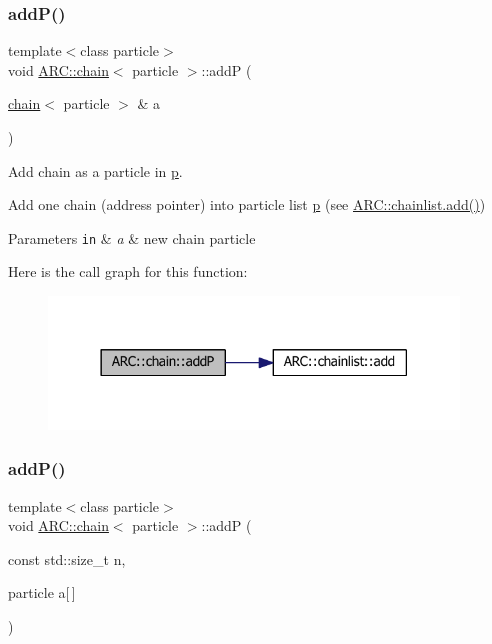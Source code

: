 \subsubsection{\texorpdfstring{add\+P()}{addP()}\hspace{0.1cm}{\footnotesize\ttfamily [2/3]}}
{\footnotesize\ttfamily template$<$class particle$>$ \\
void \hyperlink{classARC_1_1chain}{A\+R\+C\+::chain}$<$ particle $>$\+::addP (\begin{DoxyParamCaption}\item[{\hyperlink{classARC_1_1chain}{chain}$<$ particle $>$ \&}]{a }\end{DoxyParamCaption})\hspace{0.3cm}{\ttfamily [inline]}}



Add chain as a particle in \hyperlink{classARC_1_1chain_af1793b656e139e1f87c2e0a55f87514b}{p}. 

Add one chain (address pointer) into particle list \hyperlink{classARC_1_1chain_af1793b656e139e1f87c2e0a55f87514b}{p} (see \hyperlink{classARC_1_1chainlist_afa780edfa301cc22cf189e63d7a59c2c}{A\+R\+C\+::chainlist.\+add()}) 
\begin{DoxyParams}[1]{Parameters}
\mbox{\tt in}  & {\em a} & new chain particle \\
\hline
\end{DoxyParams}
Here is the call graph for this function\+:
\nopagebreak
\begin{figure}[H]
\begin{center}
\leavevmode
\includegraphics[width=309pt]{classARC_1_1chain_a22a0c3e8b42954edee0d2f66a27e8640_cgraph}
\end{center}
\end{figure}
\hypertarget{classARC_1_1chain_a658a7b777ac45e7900990dcc6ef0b752}{}\label{classARC_1_1chain_a658a7b777ac45e7900990dcc6ef0b752} 
\subsubsection{\texorpdfstring{add\+P()}{addP()}\hspace{0.1cm}{\footnotesize\ttfamily [3/3]}}
{\footnotesize\ttfamily template$<$class particle$>$ \\
void \hyperlink{classARC_1_1chain}{A\+R\+C\+::chain}$<$ particle $>$\+::addP (\begin{DoxyParamCaption}\item[{const std\+::size\+\_\+t}]{n,  }\item[{particle}]{a\mbox{[}$\,$\mbox{]} }\end{DoxyParamCaption})\hspace{0.3cm}{\ttfamily [inline]}}



